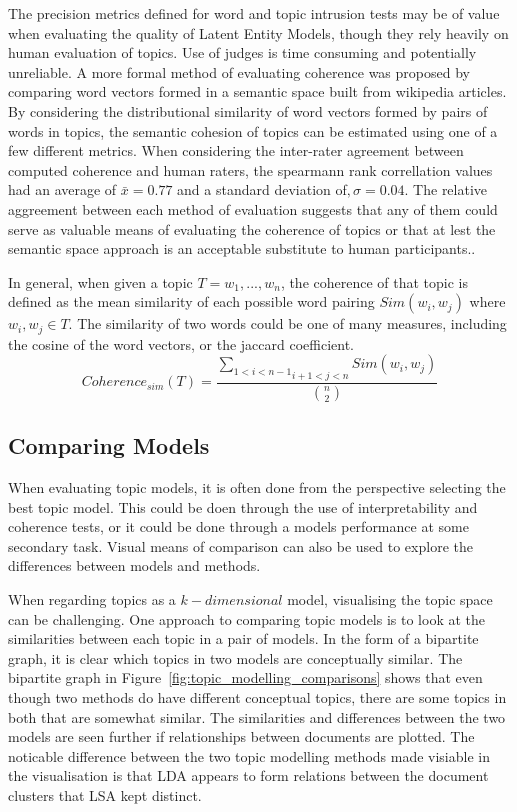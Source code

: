 \documentclass[10pt]{report}
\begin{document}
The precision metrics defined for word and topic intrusion tests may be of value when evaluating the quality of Latent Entity Models, though they rely heavily on human evaluation of topics. Use of judges is time consuming and potentially unreliable. A more formal method of evaluating coherence was proposed by comparing word vectors formed in a semantic space built from wikipedia articles. By considering the distributional similarity of word vectors formed by pairs of words in topics, the semantic cohesion of topics can be estimated using one of a few different metrics. When considering the inter-rater agreement between computed coherence and human raters, the spearmann rank correllation values had an average of  \(\bar{x}=0.77\) and a standard deviation of\(,\sigma=0.04\). The relative aggreement between each method of evaluation suggests that any of them could serve as valuable means of evaluating the coherence of topics or that at lest the semantic space approach is an acceptable substitute to human participants.. ~\cite{Aletras2013-oo}

In general, when given a topic \(T = {w_1,...,w_n}\), the coherence of that topic is defined as the mean similarity of each possible word pairing \(Sim(w_i, w_j)\) where \(w_i, w_j \in T\). The similarity of two words could be one of many measures, including the cosine of the word vectors, or the jaccard coefficient.~\cite{Newman2010-op}
\[
  Coherence_{sim}(T)=\frac{\underset{i+1<j<n}{\underset{1<i<n-1}{\sum}}Sim(w_i, w_j)}{{n \choose 2}}
\]
%
\subsection{Comparing Models}
When evaluating topic models, it is often done from the perspective selecting the best topic model. This could be doen through the use of interpretability and coherence tests, or it could be done through a models performance at some secondary task. Visual means of comparison can also be used to explore the differences between models and methods.

When regarding topics as a \(k-dimensional\) model, visualising the topic space can be challenging. One approach to comparing topic models is to look at the similarities between each topic in a pair of models. In the form of a bipartite graph, it is clear which topics in two models are conceptually similar. The bipartite graph in Figure~\ref{fig:topic_modelling_comparisons} shows that even though two methods do have different conceptual topics, there are some topics in both that are somewhat similar. The similarities and differences between the two models are seen further if relationships between documents are plotted. The noticable difference between the two topic modelling methods made visiable in the visualisation is that LDA appears to form relations between the document clusters that LSA kept distinct.~\cite{Crossno2011-sn}
\end{document}
